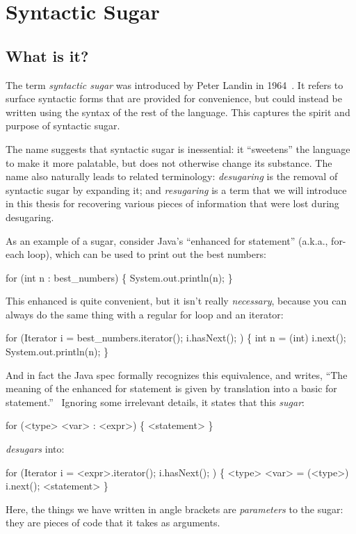 \chapter{Syntactic Sugar}

\section{What is it?}

The term \emph{syntactic sugar} was introduced by Peter Landin in
1964~\cite{syntactic-sugar}. It refers to surface syntactic forms that are provided for
convenience, but could instead be written using the syntax of the rest
of the language. This captures the spirit and purpose of syntactic
sugar.

The name suggests that syntactic sugar is inessential: it ``sweetens''
the language to make it more palatable, but does not otherwise change
its substance. The name also naturally leads to related terminology:
\emph{desugaring} is the removal of syntactic sugar by expanding it;
and \emph{resugaring} is a term that we will introduce in this thesis
for recovering various pieces of information that were lost during
desugaring.

As an example of a sugar, consider Java's ``enhanced for statement''
(a.k.a., for-each loop), which can be used to print out the best
numbers:
\begin{Codes}
for (int n : best_numbers) \{
  System.out.println(n);
\}
\end{Codes}
This enhanced  is quite convenient, but it isn't really
\emph{necessary}, because you can always do the same thing with a
regular for loop and an iterator:
\begin{Codes}
for (Iterator i = best_numbers.iterator(); i.hasNext(); ) \{
  int n = (int) i.next();
  System.out.println(n);
\}
\end{Codes}

And in fact the Java spec formally recognizes this equivalence, and
writes, ``The meaning of the enhanced for statement is given by
translation into a basic for statement.''~\cite[section 14.14.2]{java8} Ignoring some
irrelevant details, it states that this \emph{sugar}:
\begin{Codes}
for (<type> <var> : <expr>) \{ <statement> \}
\end{Codes}
\emph{desugars} into:
\begin{Codes}
for (Iterator i = <expr>.iterator(); i.hasNext(); ) \{
  <type> <var> = (<type>) i.next();
  <statement>
\}
\end{Codes}
Here, the things we have written in angle brackets are
\emph{parameters} to the sugar: they are pieces of code that it
takes as arguments.


